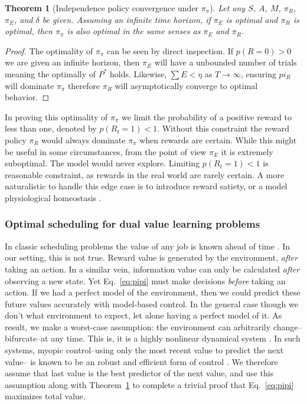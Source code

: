 \documentclass[9pt,lineno]{elife}
\newtheorem{theorem}{Theorem}
\begin{document}
\begin{theorem}[Independence policy convergence under $\pi_{\pi}$] \label{theorem:meta} 
	 Let any $S$, $A$, $M$, $\pi_R$, $\pi_E$, and $\delta$ be given. Assuming an infinite time horizon, if $\pi_E$ is optimal and $\pi_R$ is optimal, then $\pi_{\pi}$ is also optimal in the same senses as $\pi_E$ and $\pi_R$. 
\end{theorem}
\begin{proof}
	The optimality of $\pi_{\pi}$ can be seen by direct inspection. If $p(R = 0) > 0$ we are given an infinite horizon, then $\pi_E$ will have a unbounded number of trials meaning the optimally of $P^*$ holds. Likewise, $\sum E < \eta$ as $T \rightarrow \infty$, ensuring $pi_R$ will dominate $\pi_{\pi}$ therefore $\pi_R$ will asymptotically converge to optimal behavior. 
\end{proof}

In proving this optimality of $\pi_{\pi}$ we limit the probability of a positive reward to less than one, denoted by $p(R_t = 1) < 1$. Without this constraint the reward policy $\pi_R$ would always dominate $\pi_{\pi}$ when rewards are certain. While this might be useful in some circumstances, from the point of view $\pi_E$ it is extremely suboptimal. The model would never explore. Limiting $p(R_t = 1) < 1$ is reasonable constraint, as rewards in the real world are rarely certain. A more naturalistic to handle this edge case is to introduce reward satiety, or a model physiological homeostasis \citep{Keramati2014,Juechems2019}.

\subsubsection*{Optimal scheduling for dual value learning problems}
In classic scheduling problems the value of any job is known ahead of time \citep{Bellmann1954,Roughgarden2019}. In our setting, this is not true. Reward value is generated by the environment, \textit{after} taking an action. In a similar vein, information value can only be calculated \textit{after} observing a new state. Yet Eq.~\ref{eq:pipi} must make decisions \textit{before} taking an action. If we had a perfect model of the environment, then we could predict these future values accurately with model-based control. In the general case though we don't what environment to expect, let alone having a perfect model of it. As result, we make a worst-case assumption: the environment can arbitrarily change--bifurcate--at any time. This is, it is a highly nonlinear dynamical system \citep{Strogatz1994}. In such systems, myopic control--using only the most recent value to predict the next value-- is known to be an robust and efficient form of control \citep{Hocker2019}. We therefore assume that last value is the best predictor of the next value, and use this assumption along with Theorem~\ref{theorem:meta} to complete a trivial proof that Eq.~\ref{eq:pipi} maximizes total value.
\end{document}
